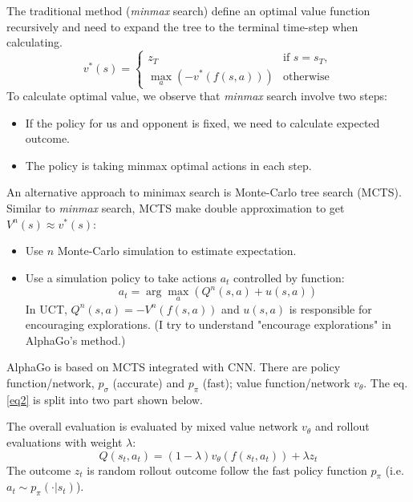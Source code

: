 \documentclass{mcmthesis}
\begin{document}
The traditional method (\textit{minmax} search) define an optimal value function   recursively  and need to expand the tree to the terminal time-step when calculating. 
\begin{equation}\label{eq1}
v^*(s)=\left\{
	\begin{array}{ll}
	z_T & \text{if  } s=s_T\text{,}\\
	\displaystyle \max_a \left(-v^*(f(s,a))\right) & \text{otherwise}
	\end{array}
	\right.
\end{equation}
To calculate optimal value, we observe that \textit{minmax} search involve two steps: 
\begin{itemize}[noitemsep]
	\item If the policy for us and opponent is fixed, we need to calculate expected outcome.
	\item   The policy is taking minmax optimal actions in each step. 	
\end{itemize}

An alternative approach to minimax search is Monte-Carlo tree search (MCTS). Similar to \textit{minmax} search, MCTS make double approximation to get $V^n(s) \approx v^*(s)$: 
\begin{itemize}[noitemsep]
	\item Use $n$ Monte-Carlo simulation to estimate expectation.
	\item Use a  simulation policy to take actions $a_t$ controlled by function: \begin{equation}\label{eq2}
	a_t=\displaystyle {\arg \max_a} (Q^n(s,a)+u(s,a)) 
	\end{equation}
	 In UCT,  $Q^n(s,a)=-V^n(f(s,a))$ and $u(s,a)$ is responsible for encouraging explorations. (I try to understand "encourage explorations" in AlphaGo's method.)
\end{itemize}


AlphaGo is based on MCTS integrated with CNN. There are policy function/network, $p_\sigma$ (accurate) and $p_\pi$ (fast); value function/network $v_\theta$. The eq. \eqref{eq2} is split into two part shown below.

The overall evaluation is evaluated by mixed value network $v_\theta$ and rollout evaluations with weight $\lambda$:
\begin{equation}
	Q(s_t,a_t)=(1-\lambda)v_\theta(f(s_t,a_t)) + \lambda z_t
\end{equation}
The outcome $z_t$ is random rollout outcome follow the fast policy function $p_\pi$ (i.e. $a_t \sim p_\pi(\cdot | s_t)$).
\end{document}

